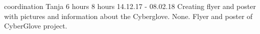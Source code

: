 	{coordination}%
	{Tanja}%
	{6 hours}%
	{8 hours}%
	{14.12.17 - 08.02.18}%
	{Creating flyer and poster with pictures and information about the Cyberglove.}%
	{None.}%
	{Flyer and poster of CyberGlove project.}%
	
	
